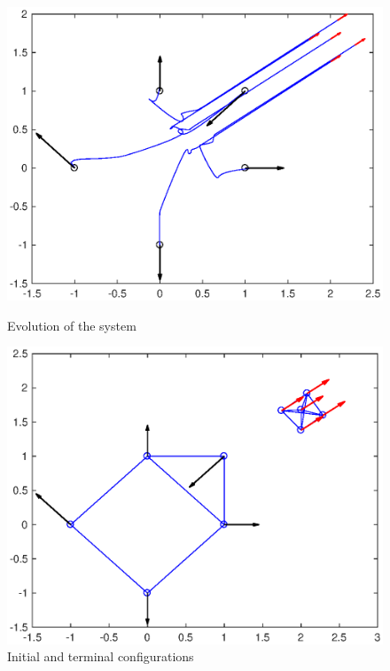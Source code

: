 \documentclass[a4paper,10pt, english]{article}
\begin{document}
\begin{figure}[ht]
  \begin{minipage}[b]{0.5\textwidth}
    \includegraphics[width=\textwidth]{figures/a5_D_ev.eps}
    \caption{Evolution of the system}
    \label{ev}
  \end{minipage}
  \hfill
  \begin{minipage}[b]{0.5\textwidth}
    \includegraphics[width=\textwidth]{figures/a5_D_g.eps}
    \caption{Initial and terminal configurations}
    \label{g}
  \end{minipage}
\end{figure}
\end{document}
